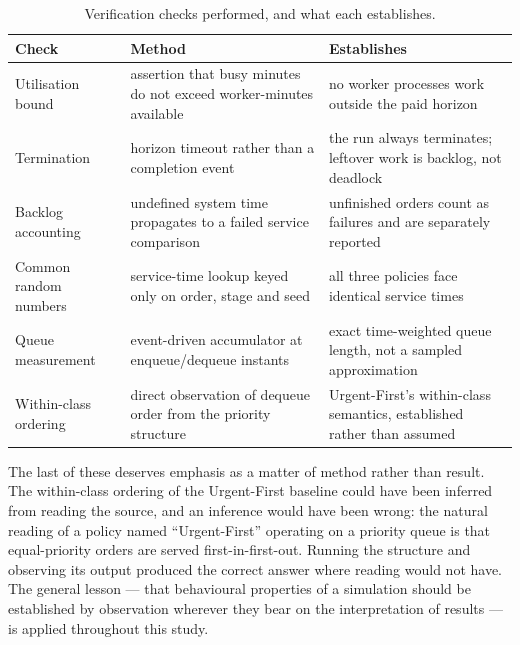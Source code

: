 \begin{table}[htbp]
\centering
\caption[Verification checks]{Verification checks performed, and what each establishes.}
\label{tab:verification}
\small
\begin{tabularx}{\textwidth}{lXX}
\toprule
\textbf{Check} & \textbf{Method} & \textbf{Establishes} \\
\midrule
Utilisation bound & assertion that busy minutes do not exceed worker-minutes available &
  no worker processes work outside the paid horizon \\
Termination & horizon timeout rather than a completion event &
  the run always terminates; leftover work is backlog, not deadlock \\
Backlog accounting & undefined system time propagates to a failed service comparison &
  unfinished orders count as failures and are separately reported \\
Common random numbers & service-time lookup keyed only on order, stage and seed &
  all three policies face identical service times \\
Queue measurement & event-driven accumulator at enqueue/dequeue instants &
  exact time-weighted queue length, not a sampled approximation \\
Within-class ordering & direct observation of dequeue order from the priority structure &
  Urgent-First's within-class semantics, established rather than assumed \\
\bottomrule
\end{tabularx}
\end{table}

The last of these deserves emphasis as a matter of method rather than result. The within-class
ordering of the Urgent-First baseline could have been inferred from reading the source, and an
inference would have been wrong: the natural reading of a policy named ``Urgent-First'' operating
on a priority queue is that equal-priority orders are served first-in-first-out. Running the
structure and observing its output produced the correct answer where reading would not have. The
general lesson --- that behavioural properties of a simulation should be established by
observation wherever they bear on the interpretation of results --- is applied throughout this
study.

